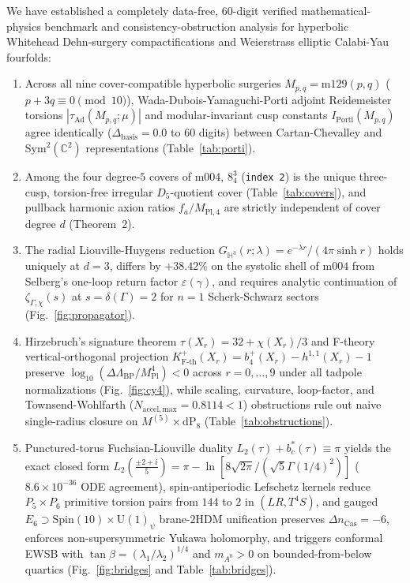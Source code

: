 \documentclass[aps,prd,twocolumn,nofootinbib,floatfix]{revtex4-2}
\begin{document}
We have established a completely data-free, $60$-digit verified mathematical-physics benchmark and consistency-obstruction analysis for hyperbolic Whitehead Dehn-surgery compactifications and Weierstrass elliptic Calabi-Yau fourfolds:
\begin{enumerate}
    \item Across all nine cover-compatible hyperbolic surgeries $M_{p,q} = \mathrm{m129}(p,q)$ ($p + 3q \equiv 0 \pmod{10}$), Wada-Dubois-Yamaguchi-Porti adjoint Reidemeister torsions $|\tau_{\mathrm{Ad}}(M_{p,q};\mu)|$ and modular-invariant cusp constants $I_{\mathrm{Porti}}(M_{p,q})$ agree identically ($\Delta_{\mathrm{basis}} = 0.0$ to $60$ digits) between Cartan-Chevalley and $\mathrm{Sym}^2(\mathbb{C}^2)$ representations (Table~\ref{tab:porti}).
    \item Among the four degree-$5$ covers of $\mathrm{m004}$, $8^3_4$ (\texttt{index 2}) is the unique three-cusp, torsion-free irregular $D_5$-quotient cover (Table~\ref{tab:covers}), and pullback harmonic axion ratios $f_a/M_{\mathrm{Pl},4}$ are strictly independent of cover degree $d$ (Theorem~2).
    \item The radial Liouville-Huygens reduction $G_{\mathbb{H}^3}(r;\lambda) = e^{-\lambda r}/(4\pi\sinh r)$ holds uniquely at $d = 3$, differs by $+38.42\%$ on the systolic shell of $\mathrm{m004}$ from Selberg's one-loop return factor $\varepsilon(\gamma)$, and requires analytic continuation of $\zeta_{\Gamma,\chi}(s)$ at $s = \delta(\Gamma) = 2$ for $n = 1$ Scherk-Schwarz sectors (Fig.~\ref{fig:propagator}).
    \item Hirzebruch's signature theorem $\tau(X_r) = 32 + \chi(X_r)/3$ and F-theory vertical-orthogonal projection $K_{\mathrm{F\text{-}th}}^+(X_r) = b_4^+(X_r) - h^{1,1}(X_r) - 1$ preserve $\log_{10}(\Delta\Lambda_{\mathrm{BP}}/M_{\mathrm{Pl}}^4) < 0$ across $r = 0,\dots,9$ under all tadpole normalizations (Fig.~\ref{fig:cy4}), while scaling, curvature, loop-factor, and Townsend-Wohlfarth ($N_{\mathrm{accel,max}} = 0.8114 < 1$) obstructions rule out naive single-radius closure on $M^{(5)}\times \mathrm{dP}_8$ (Table~\ref{tab:obstructions}).
    \item Punctured-torus Fuchsian-Liouville duality $L_2(\tau) + b_c^*(\tau) \equiv \pi$ yields the exact closed form $L_2(\frac{\pm 2+i}{5}) = \pi - \ln[8\sqrt{2\pi}/(\sqrt{5}\Gamma(1/4)^2)]$ ($8.6\times 10^{-36}$ ODE agreement), spin-antiperiodic Lefschetz kernels reduce $P_5\times P_6$ primitive torsion pairs from $144$ to $2$ in $(LR, T^4 S)$, and gauged $E_6 \supset \mathrm{Spin}(10)\times\mathrm{U}(1)_\psi$ brane-$2\mathrm{HDM}$ unification preserves $\Delta n_{\mathrm{Cas}} = -6$, enforces non-supersymmetric Yukawa holomorphy, and triggers conformal EWSB with $\tan\beta = (\lambda_1/\lambda_2)^{1/4}$ and $m_{A^0} > 0$ on bounded-from-below quartics (Fig.~\ref{fig:bridges} and Table~\ref{tab:bridges}).

\end{enumerate}
\end{document}
